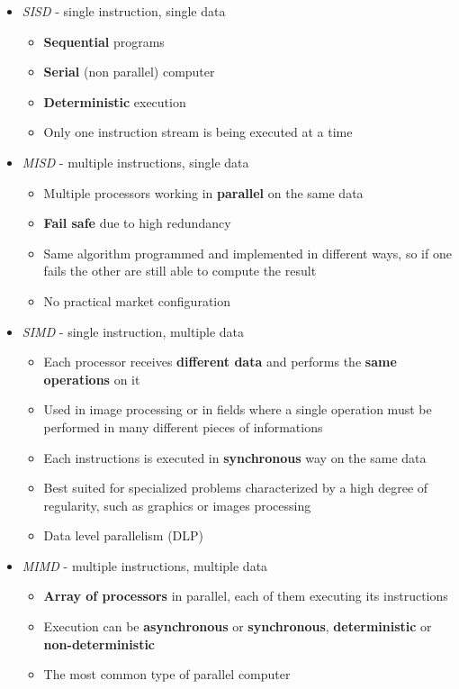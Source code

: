 \documentclass[english]{article}
\begin{document}
\begin{itemize}
  \item \textit{SISD} - single instruction, single data
        \begin{itemize}
          \item \textbf{Sequential} programs
          \item \textbf{Serial} (non parallel) computer
          \item \textbf{Deterministic} execution
          \item Only one instruction stream is being executed at a time
        \end{itemize}
  \item \textit{MISD} - multiple instructions, single data
        \begin{itemize}
          \item Multiple processors working in \textbf{parallel} on the same data
          \item \textbf{Fail safe} due to high redundancy
          \item Same algorithm programmed and implemented in different ways, so if one fails the other are still able to compute the result
          \item No practical market configuration
        \end{itemize}
  \item \textit{SIMD} - single instruction, multiple data
        \begin{itemize}
          \item Each processor receives \textbf{different data} and performs the \textbf{same operations} on it
          \item Used in image processing or in fields where a single operation must be performed in many different pieces of informations
          \item Each instructions is executed in \textbf{synchronous} way on the same data
          \item Best suited for specialized problems characterized by a high degree of regularity, such as graphics or images processing
          \item Data level parallelism (DLP)
        \end{itemize}
  \item \textit{MIMD} - multiple instructions, multiple data
        \begin{itemize}
          \item \textbf{Array of processors} in parallel, each of them executing its instructions
          \item Execution can be \textbf{asynchronous} or \textbf{synchronous}, \textbf{deterministic} or \textbf{non-deterministic}
          \item The most common type of parallel computer
        \end{itemize}
\end{itemize}
\end{document}

